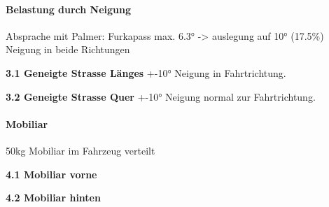 \paragraph{Belastung durch Neigung}
Absprache mit Palmer: Furkapass max. 6.3° -> auslegung auf 10° (17.5\%)
Neigung in beide Richtungen
\begin{description}
  \item \textbf{3.1 Geneigte Strasse Länges} +-10° Neigung in Fahrtrichtung.
  \item \textbf{3.2 Geneigte Strasse Quer} +-10° Neigung normal zur Fahrtrichtung.

\end{description}

\paragraph{Mobiliar}
50kg Mobiliar im Fahrzeug verteilt
\begin{description}
  \item \textbf{4.1 Mobiliar vorne}
  \item \textbf{4.2 Mobiliar hinten}
\end{description}
